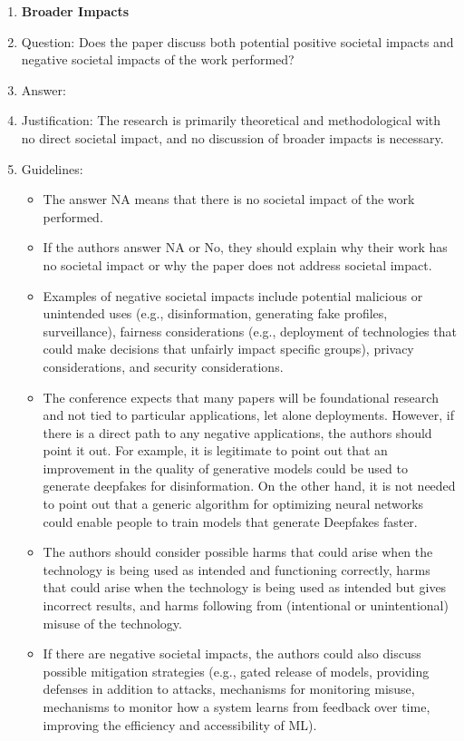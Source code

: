 \documentclass{article}
\begin{document}
\begin{enumerate}
\item {\bf Broader Impacts}
    \item[] Question: Does the paper discuss both potential positive societal impacts and negative societal impacts of the work performed?
    \item[] Answer: \answerNA{}
    \item[] Justification: The research is primarily theoretical and methodological with no direct societal impact, and no discussion of broader impacts is necessary.
    \item[] Guidelines:
    \begin{itemize}
        \item The answer NA means that there is no societal impact of the work performed.
        \item If the authors answer NA or No, they should explain why their work has no societal impact or why the paper does not address societal impact.
        \item Examples of negative societal impacts include potential malicious or unintended uses (e.g., disinformation, generating fake profiles, surveillance), fairness considerations (e.g., deployment of technologies that could make decisions that unfairly impact specific groups), privacy considerations, and security considerations.
        \item The conference expects that many papers will be foundational research and not tied to particular applications, let alone deployments. However, if there is a direct path to any negative applications, the authors should point it out. For example, it is legitimate to point out that an improvement in the quality of generative models could be used to generate deepfakes for disinformation. On the other hand, it is not needed to point out that a generic algorithm for optimizing neural networks could enable people to train models that generate Deepfakes faster.
        \item The authors should consider possible harms that could arise when the technology is being used as intended and functioning correctly, harms that could arise when the technology is being used as intended but gives incorrect results, and harms following from (intentional or unintentional) misuse of the technology.
        \item If there are negative societal impacts, the authors could also discuss possible mitigation strategies (e.g., gated release of models, providing defenses in addition to attacks, mechanisms for monitoring misuse, mechanisms to monitor how a system learns from feedback over time, improving the efficiency and accessibility of ML).
    \end{itemize}
    

\end{enumerate}
\end{document}
